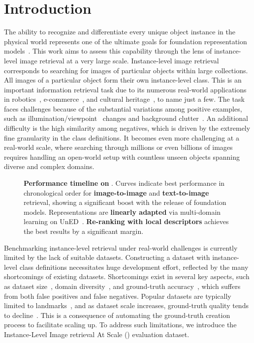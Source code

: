\section{Introduction}
The ability to recognize and differentiate every unique object instance in the physical world represents one of the ultimate goals for foundation representation models~\cite{clip,bha+,odm+24,siglip}. 
This work aims to assess this capability through the lens of instance-level image retrieval at a very large scale.
Instance-level image retrieval corresponds to searching for images of particular objects within large collections. 
All images of a particular object form their own instance-level class.
This is an important information retrieval task due to its numerous real-world applications in robotics~\cite{lcj23,sth+24}, e-commerce~\cite{eproduct, zwd+21}, and cultural heritage~\cite{sll+21,ff22}, to name just a few. 
The task faces challenges because of the substantial variations among positive examples, such as illumination/viewpoint~\cite{jc19,tas+15} changes and background clutter~\cite{mbe18,bad+21}.
An additional difficulty is the high similarity among negatives, which is driven by the extremely fine granularity in the class definitions. 
It becomes even more challenging at a real-world scale, where searching through millions or even billions of images requires handling an open-world setup with countless unseen objects spanning diverse and complex domains.


\begin{figure}[t]
  \centering
  
  \vspace{-24pt}
  \caption{\textbf{Performance timeline on \ours}. Curves indicate best performance in chronological order for {\color{appleblue}\textbf{image-to-image}} and {\color{appleorange}\textbf{text-to-image}} retrieval, showing a significant boost with the release of foundation models. Representations are {\color{applegreen}\textbf{linearly adapted}} via multi-domain learning on UnED~\cite{ycc+23}. {\color{applepurple}\textbf{Re-ranking with local descriptors}} achieves the best results by a significant margin.
  \label{fig:sota_scatter}
  \vspace{-15pt}
  }
\end{figure}

Benchmarking instance-level retrieval under real-world challenges is currently limited by the lack of suitable datasets. Constructing a dataset with instance-level class definitions necessitates huge development effort, reflected by the many shortcomings of existing datasets.
Shortcomings exist in several key aspects, such as dataset size~\cite{wj15}, domain diversity~\cite{rit+18,sxj+15}, and ground-truth accuracy~\cite{wac+20}, which suffers from both false positives and false negatives.
Popular datasets are typically limited to landmarks~\cite{rit+18}, and as dataset scale increases, ground-truth quality tends to decline~\cite{wac+20,syh+24}. 
This is a consequence of automating the ground-truth creation process to facilitate scaling up.
To address such limitations, we introduce the Instance-Level Image retrieval At Scale (\ours) evaluation dataset.

